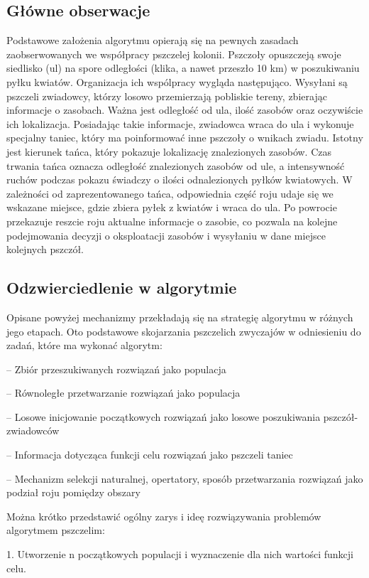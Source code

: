 \documentclass[a4paper,12pt,notitlepage]{mwrep}
\begin{document}
\subsection{Główne obserwacje}
Podstawowe założenia algorytmu opierają się na pewnych zasadach zaobserwowanych we współpracy pszczelej kolonii. Pszczoły opuszczeją swoje siedlisko (ul) na spore odległości (klika, a nawet przeszło 10 km) w poszukiwaniu pyłku kwiatów. Organizacja ich wspólpracy wygląda następująco. Wysyłani są pszczeli zwiadowcy, którzy losowo przemierzają pobliskie tereny, zbierając informacje o zasobach. Ważna jest odległość od ula, ilość zasobów oraz oczywiście ich lokalizacja. Posiadając takie informacje, zwiadowca wraca do ula i wykonuje specjalny taniec, który ma poinformować inne pszczoły o wnikach zwiadu. Istotny jest kierunek tańca, który pokazuje lokalizację znalezionych zasobów. Czas trwania tańca oznacza odległość znalezionych zasobów od ule, a intensywność ruchów podczas pokazu świadczy o ilości odnalezionych pyłków kwiatowych. W zależności od zaprezentowanego tańca, odpowiednia część roju udaje się we wskazane miejsce, gdzie zbiera pyłek z kwiatów i wraca do ula. Po powrocie przekazuje reszcie roju aktualne informacje o zasobie, co pozwala na kolejne podejmowania decyzji o oksploatacji zasobów i wysyłaniu w dane miejsce kolejnych pszczół.

\subsection{Odzwierciedlenie w algorytmie}
Opisane powyżej mechanizmy przekładają się na strategię algorytmu w różnych jego etapach. Oto podstawowe skojarzania pszczelich zwyczajów w odniesieniu do zadań, które ma wykonać algorytm:

-- Zbiór przeszukiwanych rozwiązań jako populacja

-- Równoległe przetwarzanie rozwiązań jako populacja

-- Losowe inicjowanie początkowych rozwiązań jako losowe poszukiwania pszczół-zwiadowców

-- Informacja dotycząca funkcji celu rozwiązań jako pszczeli taniec

-- Mechanizm selekcji naturalnej, opertatory, sposób przetwarzania rozwiązań jako podział roju pomiędzy obszary

Można krótko przedstawić ogólny zarys i ideę rozwiązywania problemów algorytmem pszczelim:

1. Utworzenie n początkowych populacji i wyznaczenie dla nich wartości funkcji celu.
\end{document}
